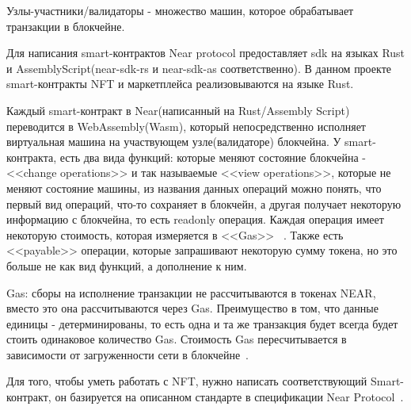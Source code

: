 \begin{definition}
    Узлы-участники/валидаторы - множество машин, которое обрабатывает транзакции в блокчейне.
\end{definition}

Для написания smart-контрактов Near protocol предоставляет sdk на языках Rust и AssemblyScript(near-sdk-rs\cite{nearsdkrs} и near-sdk-as\cite{nearsdkas} соответственно). В данном проекте smart-контракты NFT и маркетплейса реализовываются на языке Rust.

Каждый smart-контракт в Near(написанный на Rust/Assembly Script) переводится в WebAssembly(Wasm), который непосредственно исполняет виртуальная машина на участвующем узле(валидаторе) блокчейна. У smart-контракта, есть два вида функций: которые меняют состояние блокчейна - <<change operations>> и так называемые <<view operations>>, которые не меняют состояние машины, из названия данных операций можно понять, что первый вид операций, что-то сохраняет в блокчейн, а другая получает некоторую информацию с блокчейна, то есть readonly операция. Каждая операция имеет некоторую стоимость, которая измеряется в <<Gas>> ~\cite*{ramamurthy2020blockchain, docsnear}. Также есть <<payable>> операции, которые запрашивают некоторую сумму токена, но это больше не как вид функций, а дополнение к ним.

\begin{remark}
    Gas: сборы на исполнение транзакции не рассчитываются в токенах NEAR, вместо это она рассчитываются через Gas. Преимущество в том, что данные единицы - детерминированы, то есть одна и та же транзакция будет всегда будет стоить одинаковое количество Gas. Стоимость Gas пересчитывается в зависимости от загруженности сети в блокчейне~\cite*{docsnear}.
\end{remark}

Для того, чтобы уметь работать с NFT, нужно написать соответствующий Smart-контракт, он базируется на описанном стандарте в спецификации Near Protocol~\cite*{docsnear, nearspec}.


